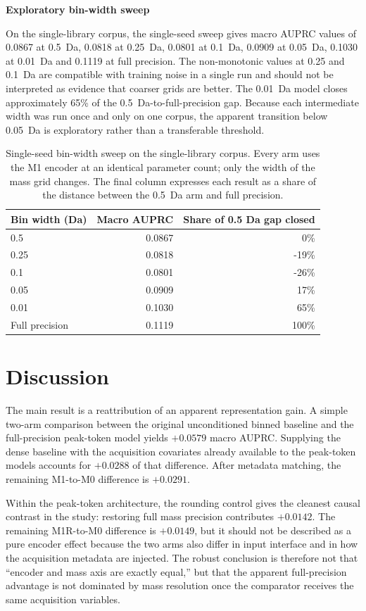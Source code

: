 \documentclass[11pt]{article}
\newcommand{\hd}[1]{\medskip\par\noindent\textbf{#1}\par\nobreak\vspace{2pt}\noindent\ignorespaces}
\begin{document}
\hd{Exploratory bin-width sweep}
On the single-library corpus, the single-seed sweep gives macro AUPRC values of 0.0867 at 0.5~Da, 0.0818 at 0.25~Da, 0.0801 at 0.1~Da, 0.0909 at 0.05~Da, 0.1030 at 0.01~Da and 0.1119 at full precision. The non-monotonic values at 0.25 and 0.1~Da are compatible with training noise in a single run and should not be interpreted as evidence that coarser grids are better. The 0.01~Da model closes approximately 65\% of the 0.5~Da-to-full-precision gap. Because each intermediate width was run once and only on one corpus, the apparent transition below 0.05~Da is exploratory rather than a transferable threshold.

\begin{table}[ht]
\centering
\caption{Single-seed bin-width sweep on the single-library corpus. Every arm uses the M1 encoder at an identical parameter count; only the width of the mass grid changes. The final column expresses each result as a share of the distance between the 0.5~Da arm and full precision.}
\label{tab:sweep}
\small
\begin{tabular}{lrr}
\toprule
Bin width (Da) & Macro AUPRC & Share of 0.5 Da gap closed\\
\midrule
0.5 & 0.0867 & 0\%\\
0.25 & 0.0818 & -19\%\\
0.1 & 0.0801 & -26\%\\
0.05 & 0.0909 & 17\%\\
0.01 & 0.1030 & 65\%\\
Full precision & 0.1119 & 100\%\\
\bottomrule
\end{tabular}
\end{table}

\section*{Discussion}
The main result is a reattribution of an apparent representation gain. A simple two-arm comparison between the original unconditioned binned baseline and the full-precision peak-token model yields $+0.0579$ macro AUPRC. Supplying the dense baseline with the acquisition covariates already available to the peak-token models accounts for $+0.0288$ of that difference. After metadata matching, the remaining M1-to-M0 difference is $+0.0291$.

Within the peak-token architecture, the rounding control gives the cleanest causal contrast in the study: restoring full mass precision contributes $+0.0142$. The remaining M1R-to-M0 difference is $+0.0149$, but it should not be described as a pure encoder effect because the two arms also differ in input interface and in how the acquisition metadata are injected. The robust conclusion is therefore not that ``encoder and mass axis are exactly equal,'' but that the apparent full-precision advantage is not dominated by mass resolution once the comparator receives the same acquisition variables.
\end{document}
